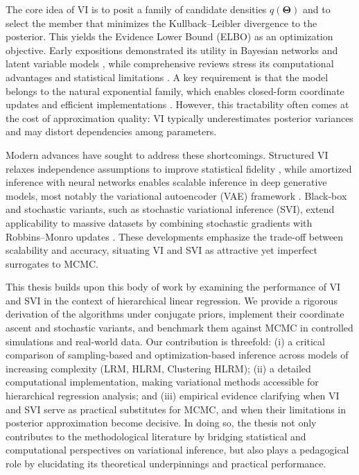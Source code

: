 \medskip

The core idea of VI is to posit a family of candidate densities $q(\bm{\Theta})$ and to select the member that minimizes the Kullback--Leibler divergence to the posterior. This yields the Evidence Lower Bound (ELBO) as an optimization objective. Early expositions demonstrated its utility in Bayesian networks and latent variable models \cite{Blei2006-kd, Ormerod2010-bc}, while comprehensive reviews stress its computational advantages and statistical limitations \cite{Blei2016VariationalIA, zhang2018advancesvariationalinference}. A key requirement is that the model belongs to the natural exponential family, which enables closed-form coordinate updates and efficient implementations \cite{Diaconis1979-lb, NIPS2000_77369e37}. However, this tractability often comes at the cost of approximation quality: VI typically underestimates posterior variances and may distort dependencies among parameters.

\medskip

Modern advances have sought to address these shortcomings. Structured VI relaxes independence assumptions to improve statistical fidelity \cite{wang22g}, while amortized inference with neural networks enables scalable inference in deep generative models, most notably the variational autoencoder (VAE) framework \cite{VAE}. Black-box and stochastic variants, such as stochastic variational inference (SVI), extend applicability to massive datasets by combining stochastic gradients with Robbins--Monro updates \cite{HOFFMAN, RANGAN}. These developments emphasize the trade-off between scalability and accuracy, situating VI and SVI as attractive yet imperfect surrogates to MCMC.

\medskip

This thesis builds upon this body of work by examining the performance of VI and SVI in the context of hierarchical linear regression. We provide a rigorous derivation of the algorithms under conjugate priors, implement their coordinate ascent and stochastic variants, and benchmark them against MCMC in controlled simulations and real-world data. Our contribution is threefold:  
(i) a critical comparison of sampling-based and optimization-based inference across models of increasing complexity (LRM, HLRM, Clustering HLRM);  
(ii) a detailed computational implementation, making variational methods accessible for hierarchical regression analysis; and  
(iii) empirical evidence clarifying when VI and SVI serve as practical substitutes for MCMC, and when their limitations in posterior approximation become decisive.  
In doing so, the thesis not only contributes to the methodological literature by bridging statistical and computational perspectives on variational inference, but also plays a pedagogical role by elucidating its theoretical underpinnings and practical performance.

